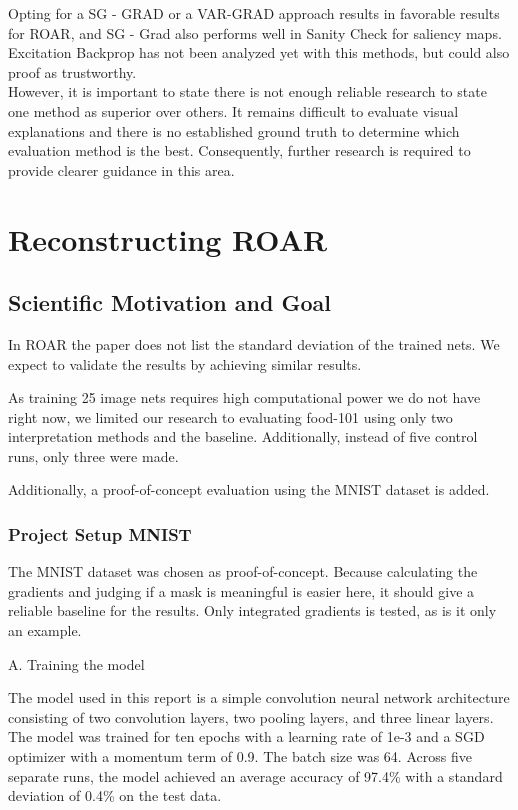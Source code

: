 Opting for  a SG - GRAD or a VAR-GRAD approach results in favorable results for ROAR, and  SG - Grad also performs well in Sanity Check for saliency maps. Excitation Backprop has not been analyzed yet with this methods, but could also proof as trustworthy. \\
However, it is important to state there is not enough reliable research to state one method as superior over others. It remains difficult to evaluate visual explanations and there is no established ground truth to determine which evaluation method is the best. Consequently, further research is required to provide clearer guidance in this area.


\chapter{Reconstructing ROAR} %
\label{sec:project}


\section{Scientific Motivation and Goal}
In ROAR \cite{hooker2019benchmark} the paper does not list the standard deviation of the trained nets. We expect to validate the results by achieving similar results.

As training 25 image nets requires high computational power we do not have right now, we limited our research to evaluating food-101 \cite{bossard14} using only two interpretation methods and the baseline. Additionally, instead of five control runs, only three were made.

Additionally, a proof-of-concept evaluation using the MNIST dataset is added.


\subsection{Project Setup MNIST}

The MNIST dataset \cite{deng2012mnist} was chosen as proof-of-concept. Because calculating the gradients and judging if a mask is meaningful is easier here, it should give a reliable baseline for the results. Only integrated gradients is tested, as is it only an example.

A. Training the model

The model used in this report is a simple convolution neural network architecture consisting of two convolution layers, two pooling layers, and three linear layers. The model was trained for ten epochs with a learning rate of 1e-3 and a SGD optimizer with a momentum term of 0.9. The batch size was 64. Across five separate runs, the model achieved an average accuracy of 97.4\% with a standard deviation of 0.4\% on the test data.

